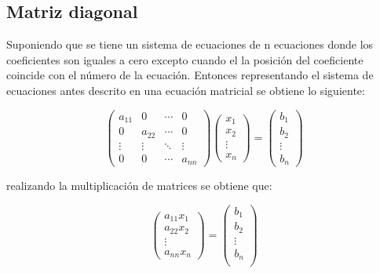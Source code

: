\subsection{Matriz diagonal}

Suponiendo que se tiene un sistema de ecuaciones de  n ecuaciones donde los coeficientes son iguales a cero excepto cuando el la posición del coeficiente coincide con el número de la ecuación. Entonces representando el sistema de ecuaciones antes descrito en una ecuación matricial se obtiene lo siguiente:

\begin{equation*}
    \begin{pmatrix}
        a_{11} & 0      & \cdots & 0      \\
        0      & a_{22} & \cdots & 0      \\
        \vdots & \vdots & \ddots & \vdots \\
        0      & 0      & \cdots & a_{nn}
    \end{pmatrix}
    \begin{pmatrix}
        x_1    \\
        x_2    \\
        \vdots \\
        x_n
    \end{pmatrix} =
    \begin{pmatrix}
        b_1    \\
        b_2    \\
        \vdots \\
        b_n
    \end{pmatrix}
\end{equation*}

realizando la multiplicación de matrices se obtiene que:

\begin{equation*}
    \begin{pmatrix}
        a_{11}x_{1} \\
        a_{22}x_{2} \\
        \vdots      \\
        a_{nn}x_{n}
    \end{pmatrix} =
    \begin{pmatrix}
        b_1    \\
        b_2    \\
        \vdots \\
        b_n    \\
    \end{pmatrix}
\end{equation*}

